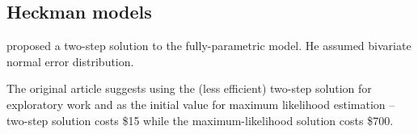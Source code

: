 \subsection{Heckman models}

\citet{heckman1976} proposed a two-step solution to the fully-parametric
model.  He assumed bivariate normal error distribution.

The original article suggests using the (less efficient) two-step
solution for exploratory work and as the initial value for maximum
likelihood estimation -- two-step solution costs \$15 while the
maximum-likelihood solution costs \$700.

